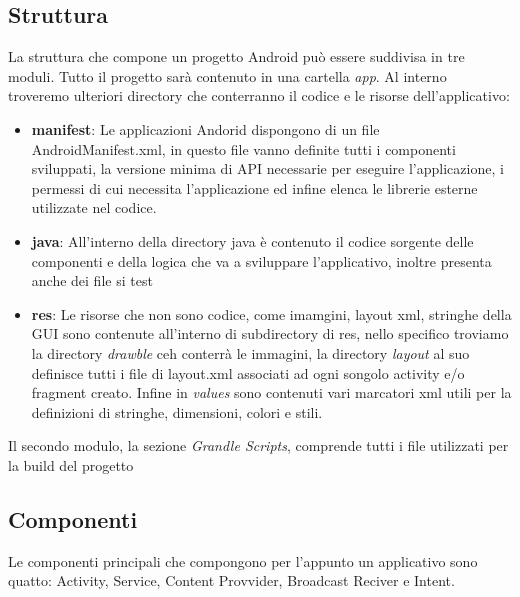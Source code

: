 \subsection{Struttura}
La struttura che compone un progetto Android può essere suddivisa in tre moduli. Tutto il progetto sarà contenuto in una cartella \textit{app}. Al interno troveremo ulteriori directory che conterranno il codice e le risorse dell'applicativo: 
\begin{itemize}
    \item \textbf{manifest}: Le applicazioni Andorid dispongono di un file AndroidManifest.xml, in questo file vanno definite tutti i componenti sviluppati, la versione minima di API necessarie per eseguire l'applicazione, i permessi di cui necessita l'applicazione ed infine elenca le librerie esterne utilizzate nel codice.  
    \item \textbf{java}: All'interno della directory java è contenuto il codice sorgente delle componenti e della logica che va a sviluppare l'applicativo, inoltre presenta anche dei file si test
    \item \textbf{res}: Le risorse che non sono codice, come imamgini, layout xml, stringhe della GUI sono contenute all'interno di subdirectory di res, nello specifico troviamo la directory \textit{drawble} ceh conterrà le immagini, la directory \textit{layout} al suo definisce tutti i file di layout.xml associati ad ogni songolo activity e/o fragment creato. Infine in \textit{values} sono contenuti vari marcatori xml utili per la definizioni di stringhe, dimensioni, colori e stili.   
\end{itemize}
Il secondo modulo, la sezione \textit{Grandle Scripts}, comprende tutti i file utilizzati per la build del progetto
\subsection{Componenti}
Le componenti principali che compongono per l'appunto un applicativo sono quatto: Activity, Service, Content Provvider, Broadcast Reciver e Intent. 

   

